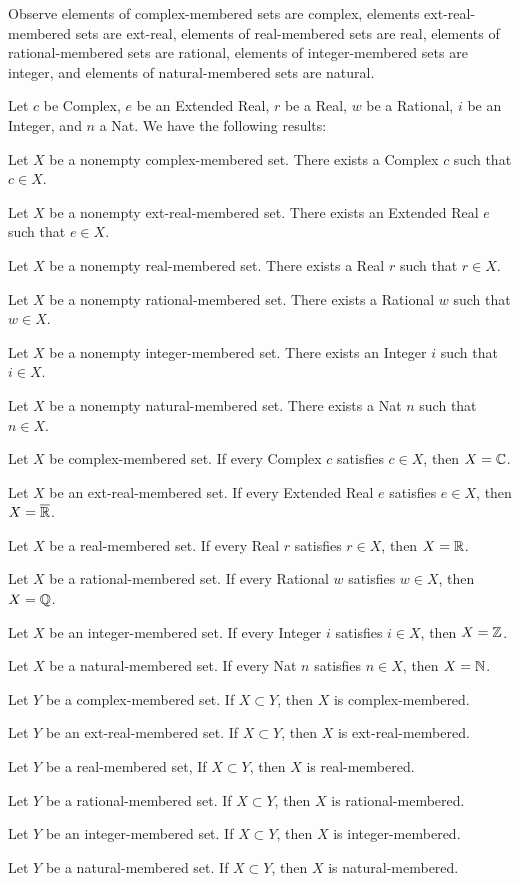 \documentclass{article}
\begin{document}
Observe elements of complex-membered sets are complex, elements
ext-real-membered sets are ext-real, elements of real-membered sets are
real, elements of rational-membered sets are rational,
elements of integer-membered sets are integer, and elements of
natural-membered sets are natural.

Let $c$ be Complex, $e$ be an Extended Real, $r$ be a Real, $w$ be a
Rational, $i$ be an Integer, and $n$ a Nat. We have the following results:
\begin{thm}
\item\label{membered:7} Let $X$ be a nonempty complex-membered set.
  There exists a Complex $c$ such that $c\in X$.
\item\label{membered:8} Let $X$ be a nonempty ext-real-membered set.
  There exists an Extended Real $e$ such that $e\in X$.
\item\label{membered:9} Let $X$ be a nonempty real-membered set.
  There exists a Real $r$ such that $r\in X$.
\item\label{membered:10} Let $X$ be a nonempty rational-membered set.
  There exists a Rational $w$ such that $w\in X$.
\item\label{membered:11} Let $X$ be a nonempty integer-membered set.
  There exists an Integer $i$ such that $i\in X$.
\item\label{membered:12} Let $X$ be a nonempty natural-membered set.
  There exists a Nat $n$ such that $n\in X$.
\item\label{membered:13} Let $X$ be complex-membered set.
  If every Complex $c$ satisfies $c\in X$, then $X=\mathbb{C}$.
\item\label{membered:14} Let $X$ be an ext-real-membered set.
  If every Extended Real $e$ satisfies $e\in X$, then $X=\overline{\mathbb{R}}$.
\item\label{membered:15} Let $X$ be a real-membered set.
  If every Real $r$ satisfies $r\in X$, then $X=\mathbb{R}$.
\item\label{membered:16} Let $X$ be a rational-membered set.
  If every Rational $w$ satisfies $w\in X$, then $X=\mathbb{Q}$.
\item\label{membered:17} Let $X$ be an integer-membered set.
  If every Integer $i$ satisfies $i\in X$, then $X=\mathbb{Z}$.
\item\label{membered:18} Let $X$ be a natural-membered set.
  If every Nat $n$ satisfies $n\in X$, then $X=\mathbb{N}$.
\item\label{membered:19} Let $Y$ be a complex-membered set.
  If $X\subset Y$, then $X$ is complex-membered.
\item\label{membered:20} Let $Y$ be an ext-real-membered set.
  If $X\subset Y$, then $X$ is ext-real-membered.
\item\label{membered:21} Let $Y$ be a real-membered set,
  If $X\subset Y$, then $X$ is real-membered.
\item\label{membered:22} Let $Y$ be a rational-membered set.
  If $X\subset Y$, then $X$ is rational-membered.
\item\label{membered:23} Let $Y$ be an integer-membered set.
  If $X\subset Y$, then $X$ is integer-membered.
\item\label{membered:24} Let $Y$ be a natural-membered set.
  If $X\subset Y$, then $X$ is natural-membered.
\end{thm}
\end{document}
